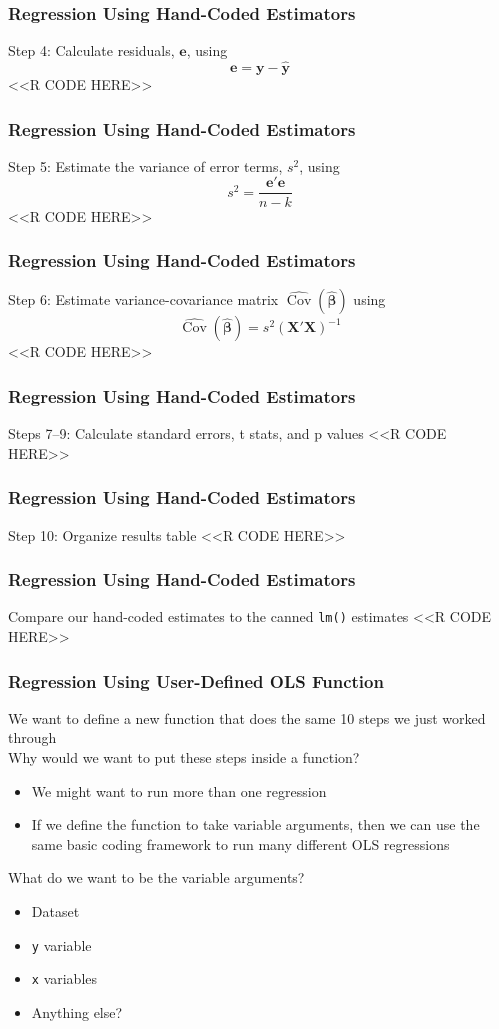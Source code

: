 \documentclass{beamer}
\DeclareMathOperator*{\Cov}{Cov}
\begin{document}
\begin{frame}[fragile]\frametitle{Regression Using Hand-Coded Estimators}
    Step 4: Calculate residuals, $\bm{e}$, using
    $$\bm{e} = \bm{y} - \widehat{\bm{y}}$$
    <<R CODE HERE>>
\end{frame}

\begin{frame}[fragile]\frametitle{Regression Using Hand-Coded Estimators}
    Step 5: Estimate the variance of error terms, $s^2$, using
    $$s^2 = \frac{\bm{e}' \bm{e}}{n - k}$$
    <<R CODE HERE>>
\end{frame}

\begin{frame}[fragile]\frametitle{Regression Using Hand-Coded Estimators}
    Step 6: Estimate variance-covariance matrix $\widehat{\Cov}(\widehat{\bm{\beta}})$ using 
    $$\widehat{\Cov}(\widehat{\bm{\beta}}) = s^2 (\bm{X}' \bm{X})^{-1}$$
    <<R CODE HERE>>
\end{frame}

\begin{frame}[fragile]\frametitle{Regression Using Hand-Coded Estimators}
    Steps 7--9: Calculate standard errors, t stats, and p values
    <<R CODE HERE>>
\end{frame}

\begin{frame}[fragile]\frametitle{Regression Using Hand-Coded Estimators}
    Step 10: Organize results table
    <<R CODE HERE>>
\end{frame}

\begin{frame}[fragile]\frametitle{Regression Using Hand-Coded Estimators}
    Compare our hand-coded estimates to the canned \texttt{lm()} estimates
    \vspace{1ex}
    <<R CODE HERE>>
\end{frame}

\begin{frame}[fragile]\frametitle{Regression Using User-Defined OLS Function}
    We want to define a new function that does the same 10 steps we just worked through \\
    \vspace{3ex}
    Why would we want to put these steps inside a function?
    \begin{itemize}
        \item We might want to run more than one regression
        \item If we define the function to take variable arguments, then we can use the same basic coding framework to run many different OLS regressions
    \end{itemize}
    \vspace{3ex}
    What do we want to be the variable arguments?
    \begin{itemize}
        \item Dataset
        \item \texttt{y} variable
        \item \texttt{x} variables
        \item Anything else?
    \end{itemize}
\end{frame}
\end{document}
